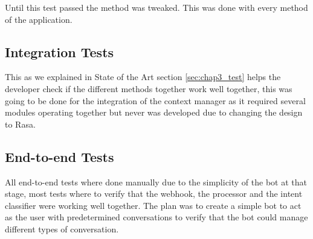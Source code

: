 Until this test passed the method was tweaked. This was done with every method of the application.

\subsection{Integration Tests}\label{sec:chap4_test_inte}

This as we explained in State of the Art section \ref{sec:chap3_test} helps the developer check if the different methods together work well together, this was going to be done for the integration of the context manager as it required several modules operating together but never was developed due to changing the design to Rasa.

\subsection{End-to-end Tests}\label{sec:chap4_test_end}

All end-to-end tests where done manually due to the simplicity of the bot at that stage, most tests where to verify that the webhook, the processor and the intent classifier were working well together. The plan was to create a simple bot to act as the user with predetermined conversations to verify that the bot could manage different types of conversation.